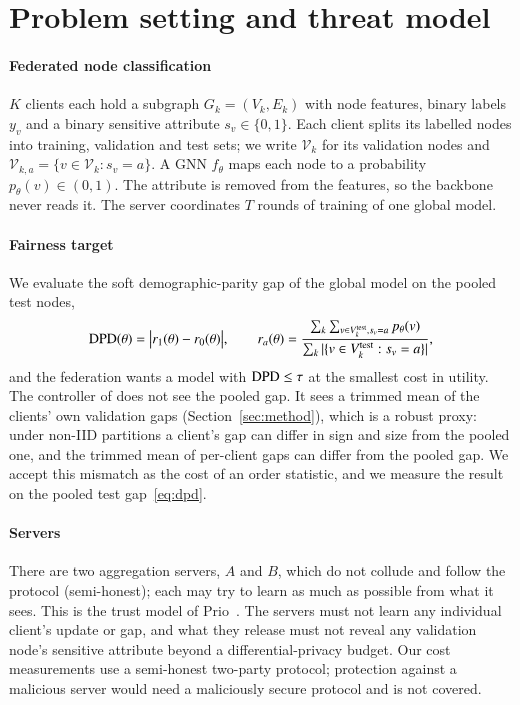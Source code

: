 \section{Problem setting and threat model}\label{sec:problem}

\paragraph{Federated node classification}
$K$ clients each hold a subgraph $G_k=(V_k,E_k)$ with node features, binary labels $y_v$ and a binary sensitive attribute $s_v\in\{0,1\}$. Each client splits its labelled nodes into training, validation and test sets; we write $\mathcal{V}_k$ for its validation nodes and $\mathcal{V}_{k,a}=\{v\in\mathcal{V}_k:s_v=a\}$. A GNN $f_\theta$ maps each node to a probability $p_\theta(v)\in(0,1)$. The attribute is removed from the features, so the backbone never reads it. The server coordinates $T$ rounds of training of one global model.

\paragraph{Fairness target}
We evaluate the soft demographic-parity gap of the global model on the pooled test nodes,
\begin{equation}\label{eq:dpd}
\mathrm{DPD}(\theta)=\bigl|r_1(\theta)-r_0(\theta)\bigr|,\qquad r_a(\theta)=\frac{\sum_k\sum_{v\in V_k^{\mathrm{test}},s_v=a}p_\theta(v)}{\sum_k|\{v\in V_k^{\mathrm{test}}:s_v=a\}|},
\end{equation}
and the federation wants a model with $\mathrm{DPD}\le\tau$ at the smallest cost in utility. The controller of \rt{} does not see the pooled gap. It sees a trimmed mean of the clients' own validation gaps (Section~\ref{sec:method}), which is a robust proxy: under non-IID partitions a client's gap can differ in sign and size from the pooled one, and the trimmed mean of per-client gaps can differ from the pooled gap. We accept this mismatch as the cost of an order statistic, and we measure the result on the pooled test gap~\eqref{eq:dpd}.

\paragraph{Servers}
There are two aggregation servers, $A$ and $B$, which do not collude and follow the protocol (semi-honest); each may try to learn as much as possible from what it sees. This is the trust model of Prio~\citep{corrigangibbs2017prio}. The servers must not learn any individual client's update or gap, and what they release must not reveal any validation node's sensitive attribute beyond a differential-privacy budget. Our cost measurements use a semi-honest two-party protocol; protection against a malicious server would need a maliciously secure protocol and is not covered.


